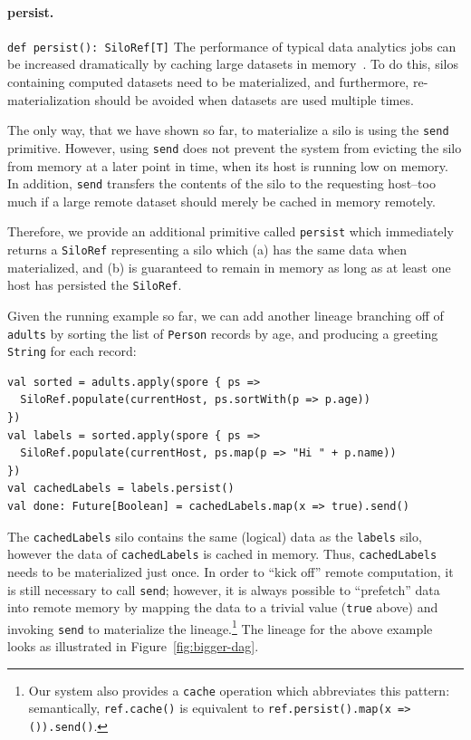 \documentclass{jfp1}
\begin{document}
\paragraph{persist.}%
%
\texttt{def persist(): SiloRef[T]} \newline
%
The performance of typical data analytics jobs can be increased
dramatically by caching large datasets in memory~\cite{Spark}. To do
this, silos containing computed datasets need to be materialized, and
furthermore, re-materialization should be avoided when datasets are
used multiple times.

The only way, that we have shown so far, to materialize a silo is
using the \verb|send| primitive. However, using \verb|send| does not
prevent the system from evicting the silo from memory at a later point
in time, \eg when its host is running low on memory. In addition,
\verb|send| transfers the contents of the silo to the requesting
host--too much if a large remote dataset should merely be cached in
memory remotely.

Therefore, we provide an additional primitive called \verb|persist|
which immediately returns a \verb|SiloRef| representing a silo which
(a) has the same data when materialized, and (b) is guaranteed to
remain in memory as long as at least one host has persisted the \verb|SiloRef|.

Given the running example so far, we can add another lineage branching
off of \verb|adults| by sorting the list of \verb|Person| records by
age, and producing a greeting \verb|String| for each record:

\begin{lstlisting}
val sorted = adults.apply(spore { ps =>
  SiloRef.populate(currentHost, ps.sortWith(p => p.age))
})
val labels = sorted.apply(spore { ps =>
  SiloRef.populate(currentHost, ps.map(p => "Hi " + p.name))
})
val cachedLabels = labels.persist()
val done: Future[Boolean] = cachedLabels.map(x => true).send()
\end{lstlisting}
\noindent
The \verb|cachedLabels| silo contains the same (logical) data as the
\verb|labels| silo, however the data of \verb|cachedLabels| is cached
in memory. Thus, \verb|cachedLabels| needs to be materialized just
once. In order to ``kick off'' remote computation, it is still
necessary to call \verb|send|; however, it is always possible to
``prefetch'' data into remote memory by mapping the data to a trivial
value (\verb|true| above) and invoking \verb|send| to materialize the
lineage.\footnote{Our system also provides a \texttt{cache} operation
  which abbreviates this pattern: semantically, \texttt{ref.cache()}
  is equivalent to \texttt{ref.persist().map(x => ()).send()}.} The
lineage for the above example looks as illustrated in
Figure~\ref{fig:bigger-dag}.
\end{document}
